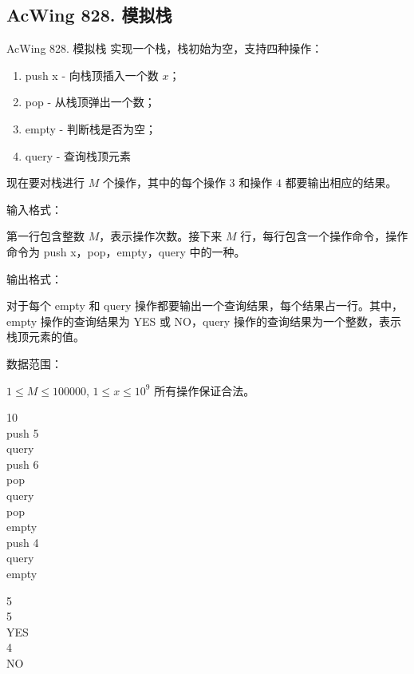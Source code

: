 \subsection{AcWing 828. 模拟栈}
\begin{titledbox}{AcWing 828. 模拟栈}
实现一个栈，栈初始为空，支持四种操作：

\begin{enumerate}
    \itemsep=-5pt
    \item push x - 向栈顶插入一个数 $x$；
    \item pop - 从栈顶弹出一个数；
    \item empty - 判断栈是否为空；
    \item query - 查询栈顶元素
\end{enumerate}

现在要对栈进行 $M$ 个操作，其中的每个操作 $3$ 和操作 $4$ 都要输出相应的结果。

输入格式：

第一行包含整数 $M$，表示操作次数。接下来 $M$ 行，每行包含一个操作命令，操作命令为 push x，pop，empty，query 中的一种。

输出格式：

对于每个 empty 和 query 操作都要输出一个查询结果，每个结果占一行。其中，empty 操作的查询结果为 YES 或 NO，query 操作的查询结果为一个整数，表示栈顶元素的值。

数据范围：

$1 \le M \le 100000$, $1 \le x \le 10^9$ 所有操作保证合法。

\begin{inputblock}
    10 \\
    push 5  \\
    query  \\
    push 6  \\
    pop  \\
    query  \\
    pop  \\
    empty  \\
    push 4  \\
    query  \\
    empty 
\end{inputblock}
\begin{outputblock}
    5 \\
    5 \\
    YES \\
    4 \\
    NO
\end{outputblock}
\end{titledbox}

